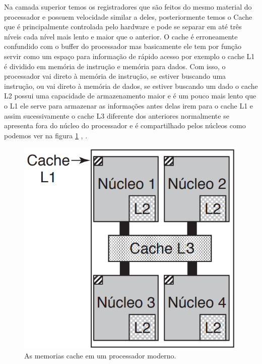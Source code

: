 Na camada superior temos os registradores que são feitos do mesmo material do processador e possuem velocidade similar a deles, posteriormente temos o Cache que é principalmente controlada pelo hardware e pode se separar em até  três níveis cada nível  mais lento e maior que o anterior. O cache é erroneamente confundido com o buffer do processador mas basicamente ele tem por função servir como um espaço para informação de rápido acesso por exemplo  o cache L1 é dividido em memória de instrução e memória para dados. Com isso, o processador vai direto à memória de instrução, se estiver buscando uma instrução, ou vai direto à memória de dados, se estiver buscando um dado o cache L2 possui uma capacidade de armazenamento maior e é um pouco mais lento que o L1 ele serve para armazenar as informações antes delas irem para o cache L1 e assim sucessivamente o cache L3 diferente dos anteriores normalmente se apresenta fora do núcleo do processador e é compartilhado pelos núcleos como podemos ver na figura \ref{fig:cache}  \cite{Tanenbaum2016}, \cite{Comer2012}.\\
\begin{figure}[htpb]
    \centering
   \includegraphics[scale=0.4]{imagens/cache.png}
   \caption{As memorias cache em um processador moderno.}
   \label{fig:cache}
\end{figure}\\

